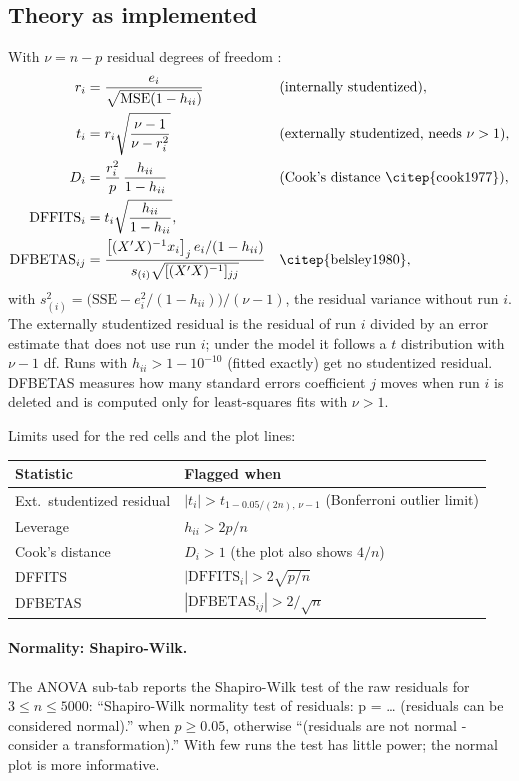 \subsection*{Theory as implemented}
With $\nu=n-p$ residual degrees of freedom \citep{montgomery2017,myers2016}:
\begin{align}
  r_i&=\frac{e_i}{\sqrt{\text{MSE}(1-h_{ii})}} &&\text{(internally studentized)}, \label{eq:ch05-rint}\\
  t_i&=r_i\sqrt{\frac{\nu-1}{\nu-r_i^2}} &&\text{(externally studentized, needs } \nu>1), \label{eq:ch05-rext}\\
  D_i&=\frac{r_i^2}{p}\,\frac{h_{ii}}{1-h_{ii}} &&\text{(Cook's distance \citep{cook1977})}, \label{eq:ch05-cook}\\
  \text{DFFITS}_i&=t_i\sqrt{\frac{h_{ii}}{1-h_{ii}}}, && \label{eq:ch05-dffits}\\
  \text{DFBETAS}_{ij}&=\frac{\big[(X'X)^{-1}x_i\big]_j\,e_i/(1-h_{ii})}{s_{(i)}\sqrt{[(X'X)^{-1}]_{jj}}}
  && \text{\citep{belsley1980}}, \label{eq:ch05-dfbetas}
\end{align}
with $s_{(i)}^2=\big(\text{SSE}-e_i^2/(1-h_{ii})\big)/(\nu-1)$, the residual variance without run $i$.
The externally studentized residual is the residual of run $i$ divided by an error estimate that does not
use run $i$; under the model it follows a $t$ distribution with $\nu-1$ df. Runs with
$h_{ii}>1-10^{-10}$ (fitted exactly) get no studentized residual. DFBETAS measures how many standard errors
coefficient $j$ moves when run $i$ is deleted and is computed only for least-squares fits with $\nu>1$.

Limits used for the red cells and the plot lines:
\begin{center}\small
\begin{tabular}{@{}ll@{}}
\toprule
Statistic & Flagged when \\
\midrule
Ext.\ studentized residual & $|t_i|>t_{1-0.05/(2n),\,\nu-1}$ (Bonferroni outlier limit) \\
Leverage & $h_{ii}>2p/n$ \\
Cook's distance & $D_i>1$ (the plot also shows $4/n$) \\
DFFITS & $|\text{DFFITS}_i|>2\sqrt{p/n}$ \\
DFBETAS & $|\text{DFBETAS}_{ij}|>2/\sqrt n$ \\
\bottomrule
\end{tabular}
\end{center}

\paragraph{Normality: Shapiro-Wilk.} The ANOVA sub-tab reports the Shapiro-Wilk test of the raw residuals
\citep{shapiro1965} for $3\le n\le5000$: ``Shapiro-Wilk normality test of residuals: p = \dots{} (residuals
can be considered normal).'' when $p\ge0.05$, otherwise ``(residuals are not normal - consider a
transformation).'' With few runs the test has little power; the normal plot is more informative.

